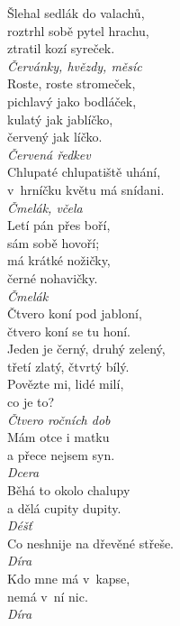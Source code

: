 \begin{multicols}{4}
\noindent
Šlehal sedlák do valachů,\\
roztrhl sobě pytel hrachu,\\
ztratil kozí syreček.\\[1 mm]
{\sl Červánky, hvězdy, měsíc}\\

\noindent
Roste, roste stromeček,\\
pichlavý jako bodláček,\\
kulatý jak jablíčko,\\
červený jak líčko.\\[1 mm]
{\sl Červená ředkev}\\

\noindent
Chlupaté chlupatiště uhání,\\
v~hrníčku květu má snídani.\\[1 mm]
{\sl Čmelák, včela}\\

\noindent
Letí pán přes boří,\\
sám sobě hovoří;\\
má krátké nožičky,\\
černé nohavičky.\\[1 mm]
{\sl Čmelák}\\

\noindent
Čtvero koní pod jabloní,\\
čtvero koní se tu honí.\\
Jeden je černý, druhý zelený,\\
třetí zlatý, čtvrtý bílý.\\
Povězte mi, lidé milí,\\
co je to?\\[1 mm]
{\sl Čtvero ročních dob}\\

\noindent
Mám otce i matku\\
a přece nejsem syn.\\[1 mm]
{\sl Dcera}\\

\noindent
Běhá to okolo chalupy\\
a dělá cupity dupity.\\[1 mm]
{\sl Déšť}\\

\noindent
Co neshnije na dřevěné střeše.\\[1 mm]
{\sl Díra}\\

\noindent
Kdo mne má v~kapse,\\
nemá v~ní nic.\\[1 mm]
{\sl Díra}\\


\end{multicols}

